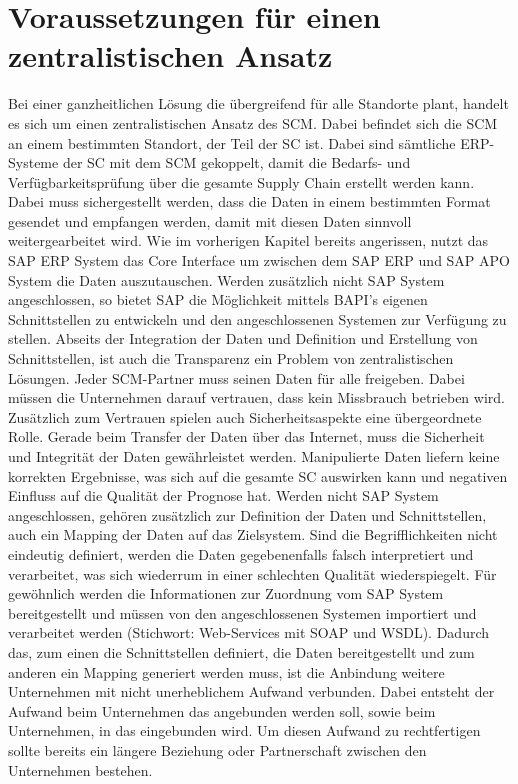 \section{Voraussetzungen für einen zentralistischen Ansatz}
Bei einer ganzheitlichen Lösung die übergreifend für alle Standorte plant, handelt es sich um einen zentralistischen Ansatz des \ac{SCM}.
Dabei befindet sich die \ac{SCM} an einem bestimmten Standort, der Teil der \ac{SC} ist. Dabei sind sämtliche \ac{ERP}-Systeme der \ac{SC} mit dem \ac{SCM} gekoppelt, damit die Bedarfs- und Verfügbarkeitsprüfung über die gesamte Supply Chain erstellt werden kann.
Dabei muss sichergestellt werden, dass die Daten in einem bestimmten Format gesendet und empfangen werden, damit mit diesen Daten sinnvoll weitergearbeitet wird. Wie im vorherigen Kapitel bereits angerissen, nutzt das SAP \ac{ERP} System das Core Interface \cite{scm:cif_10} um zwischen dem SAP \ac{ERP} und SAP \ac{APO} System die Daten auszutauschen.
Werden zusätzlich nicht SAP System angeschlossen, so bietet SAP die Möglichkeit mittels \ac{BAPI}’s eigenen Schnittstellen zu entwickeln und den angeschlossenen Systemen zur Verfügung zu stellen. 
Abseits der Integration der Daten und Definition und Erstellung von Schnittstellen, ist auch die Transparenz ein Problem von zentralistischen Lösungen. Jeder \ac{SCM}-Partner muss seinen Daten für alle freigeben. Dabei müssen die Unternehmen darauf vertrauen, dass kein Missbrauch betrieben wird. Zusätzlich zum Vertrauen spielen auch Sicherheitsaspekte eine übergeordnete Rolle. 
Gerade beim Transfer der Daten über das Internet, muss die Sicherheit und Integrität der Daten gewährleistet werden. Manipulierte Daten liefern keine korrekten Ergebnisse, was sich auf die gesamte \ac{SC} auswirken kann und negativen Einfluss auf die Qualität der Prognose hat. 
Werden nicht SAP System angeschlossen, gehören zusätzlich zur Definition der Daten und Schnittstellen, auch ein Mapping der Daten auf das Zielsystem. Sind die Begrifflichkeiten nicht eindeutig definiert, werden die Daten gegebenenfalls falsch interpretiert und verarbeitet, was sich wiederrum in einer schlechten Qualität wiederspiegelt. Für gewöhnlich werden die Informationen zur Zuordnung vom SAP System bereitgestellt und müssen von den angeschlossenen Systemen importiert und verarbeitet werden (Stichwort: Web-Services mit SOAP und WSDL).
Dadurch das, zum einen die Schnittstellen definiert, die Daten bereitgestellt und zum anderen ein Mapping generiert werden muss, ist die Anbindung weitere Unternehmen mit nicht unerheblichem Aufwand verbunden. Dabei entsteht der Aufwand beim Unternehmen das angebunden werden soll, sowie beim Unternehmen, in das eingebunden wird. Um diesen Aufwand zu rechtfertigen sollte bereits ein längere Beziehung oder Partnerschaft zwischen den Unternehmen bestehen.

